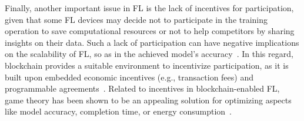 \documentclass[lettersize,journal]{IEEEtran}
\begin{document}
Finally, another important issue in FL is the lack of incentives for participation, given that some FL devices may decide not to participate in the training operation to save computational resources or not to help competitors by sharing insights on their data. Such a lack of participation can have negative implications on the scalability of FL, so as in the achieved model's accuracy~\cite{zhan2020learning}. In this regard, blockchain provides a suitable environment to incentivize participation, as it is built upon embedded economic incentives (e.g., transaction fees) and programmable agreements~\cite{somy2019ownership}. 
Related to incentives in blockchain-enabled FL, game theory has been shown to be an appealing solution for optimizing aspects like model accuracy, completion time, or energy consumption~\cite{tu2022incentive}.
\end{document}
